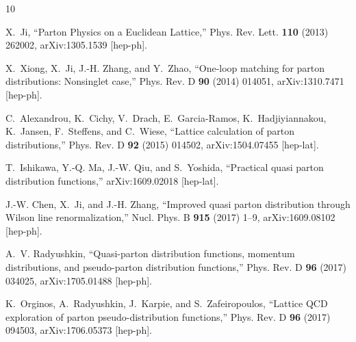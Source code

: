 \providecommand{\href}[2]{#2}\begingroup\raggedright\begin{thebibliography}{10}

X.~Ji, ``{Parton Physics on a Euclidean Lattice},''
  \href{http://dx.doi.org/10.1103/PhysRevLett.110.262002}{Phys. Rev. Lett.
  {\bfseries 110} (2013) 262002},
\href{http://arxiv.org/abs/1305.1539}{{\ttfamily arXiv:1305.1539 [hep-ph]}}.

X.~Xiong, X.~Ji, J.-H. Zhang, and Y.~Zhao, ``{One-loop matching for parton
  distributions: Nonsinglet case},''
  \href{http://dx.doi.org/10.1103/PhysRevD.90.014051}{Phys. Rev. D {\bfseries
  90} (2014) 014051},
\href{http://arxiv.org/abs/1310.7471}{{\ttfamily arXiv:1310.7471 [hep-ph]}}.

C.~Alexandrou, K.~Cichy, V.~Drach, E.~Garcia-Ramos, K.~Hadjiyiannakou,
  K.~Jansen, F.~Steffens, and C.~Wiese, ``{Lattice calculation of parton
  distributions},'' \href{http://dx.doi.org/10.1103/PhysRevD.92.014502}{Phys.
  Rev. D {\bfseries 92} (2015) 014502},
\href{http://arxiv.org/abs/1504.07455}{{\ttfamily arXiv:1504.07455 [hep-lat]}}.

T.~Ishikawa, Y.-Q. Ma, J.-W. Qiu, and S.~Yoshida, ``{Practical quasi parton
  distribution functions},''
\href{http://arxiv.org/abs/1609.02018}{{\ttfamily arXiv:1609.02018 [hep-lat]}}.

J.-W. Chen, X.~Ji, and J.-H. Zhang, ``{Improved quasi parton distribution
  through Wilson line renormalization},''
  \href{http://dx.doi.org/10.1016/j.nuclphysb.2016.12.004}{Nucl. Phys. B
  {\bfseries 915} (2017) 1--9},
\href{http://arxiv.org/abs/1609.08102}{{\ttfamily arXiv:1609.08102 [hep-ph]}}.

A.~V. Radyushkin, ``{Quasi-parton distribution functions, momentum
  distributions, and pseudo-parton distribution functions},''
  \href{http://dx.doi.org/10.1103/PhysRevD.96.034025}{Phys. Rev. D {\bfseries
  96} (2017) 034025},
\href{http://arxiv.org/abs/1705.01488}{{\ttfamily arXiv:1705.01488 [hep-ph]}}.

K.~Orginos, A.~Radyushkin, J.~Karpie, and S.~Zafeiropoulos, ``{Lattice QCD
  exploration of parton pseudo-distribution functions},''
  \href{http://dx.doi.org/10.1103/PhysRevD.96.094503}{Phys. Rev. D {\bfseries
  96} (2017) 094503},
\href{http://arxiv.org/abs/1706.05373}{{\ttfamily arXiv:1706.05373 [hep-ph]}}.


\end{thebibliography}
